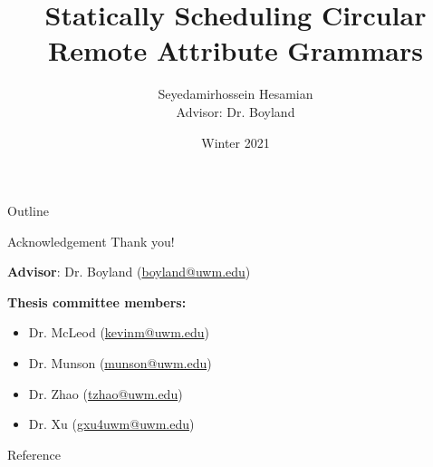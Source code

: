 \documentclass{beamer}
\title{Statically Scheduling Circular Remote Attribute Grammars}
\author[Seyedamirhossein Hesamian]{Seyedamirhossein Hesamian \texorpdfstring{\\{\small Advisor: Dr. Boyland}}{}}
\institute[UW-Milwaukee] %
{
  Department of Computer Science\\
  University of Wisconsin Milwaukee
}
\date{Winter 2021}
\newcommand{\emptyline}{\vspace{0.3cm}}
\begin{document}
\begin{frame}
  \titlepage
\end{frame}

\begin{frame}{Outline}
\tiny
  \tableofcontents
\end{frame}












\begin{frame}{Acknowledgement}{}
    {\huge \alert{Thank you!}}
    
    \emptyline
    
    \emptyline
    
    \textbf{Advisor}: Dr. Boyland (\url{boyland@uwm.edu})
    
    \emptyline
    
    \textbf{Thesis committee members:}
        \begin{itemize}
            \item Dr. McLeod (\url{kevinm@uwm.edu})
            \item Dr. Munson (\url{munson@uwm.edu})
            \item Dr. Zhao (\url{tzhao@uwm.edu})
            \item Dr. Xu (\url{gxu4uwm@uwm.edu})
        \end{itemize}
    
\end{frame}

\begin{frame}{Reference}{}
{\tiny \fontsize{1.5}{4}\selectfont

{}
}
\end{frame}
\end{document}
